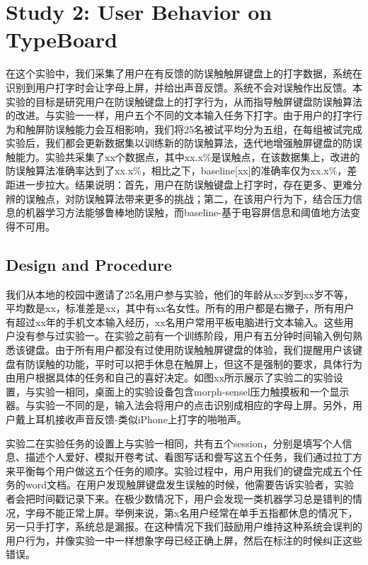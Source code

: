 \section{Study 2: User Behavior on TypeBoard}

在这个实验中，我们采集了用户在有反馈的防误触触屏键盘上的打字数据，系统在识别到用户打字时会让字母上屏，并给出声音反馈。系统不会对误触作出反馈。本实验的目标是研究用户在防误触键盘上的打字行为，从而指导触屏键盘防误触算法的改进。与实验一一样，用户五个不同的文本输入任务下打字。由于用户的打字行为和触屏防误触能力会互相影响，我们将25名被试平均分为五组，在每组被试完成实验后，我们都会更新数据集以训练新的防误触算法，迭代地增强触屏键盘的防误触能力。实验共采集了xx个数据点，其中xx.x\%是误触点，在该数据集上，改进的防误触算法准确率达到了xx.x\%，相比之下，baseline[xx]的准确率仅为xx.x\%，差距进一步拉大。结果说明：首先，用户在防误触键盘上打字时，存在更多、更难分辨的误触点，对防误触算法带来更多的挑战；第二，在该用户行为下，结合压力信息的机器学习方法能够鲁棒地防误触，而baseline-基于电容屏信息和阈值地方法变得不可用。

\subsection{Design and Procedure}

我们从本地的校园中邀请了25名用户参与实验，他们的年龄从xx岁到xx岁不等，平均数是xx，标准差是xx，其中有xx名女性。所有的用户都是右撇子，所有用户有超过xx年的手机文本输入经历，xx名用户常用平板电脑进行文本输入。这些用户没有参与过实验一。在实验之前有一个训练阶段，用户有五分钟时间输入例句熟悉该键盘。由于所有用户都没有过使用防误触触屏键盘的体验，我们提醒用户该键盘有防误触的功能，平时可以把手休息在触屏上，但这不是强制的要求，具体行为由用户根据具体的任务和自己的喜好决定。如图xx所示展示了实验二的实验设置，与实验一相同，桌面上的实验设备包含morph-sensel压力触摸板和一个显示器。与实验一不同的是，输入法会将用户的点击识别成相应的字母上屏。另外，用户戴上耳机接收声音反馈-类似iPhone上打字的啪啪声。

实验二在实验任务的设置上与实验一相同，共有五个session，分别是填写个人信息、描述个人爱好、模拟开卷考试、看图写话和誊写这五个任务，我们通过拉丁方来平衡每个用户做这五个任务的顺序。实验过程中，用户用我们的键盘完成五个任务的word文档。在用户发现触屏键盘发生误触的时候，他需要告诉实验者，实验者会把时间戳记录下来。在极少数情况下，用户会发现一类机器学习总是错判的情况，字母不能正常上屏。举例来说，第x名用户经常在单手五指都休息的情况下，另一只手打字，系统总是漏报。在这种情况下我们鼓励用户维持这种系统会误判的用户行为，并像实验一中一样想象字母已经正确上屏，然后在标注的时候纠正这些错误。

